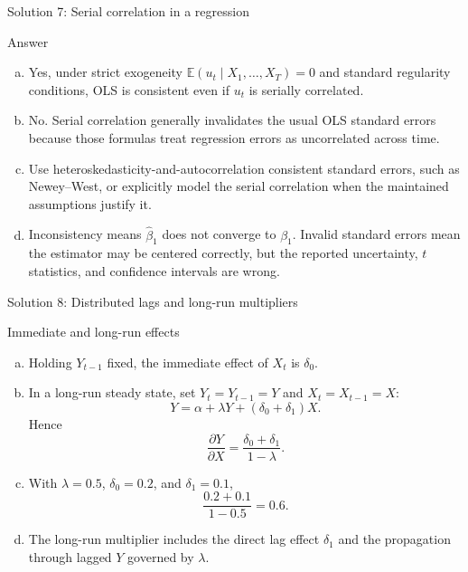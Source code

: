 \documentclass[10pt]{beamer}
\newcommand{\E}{\mathbb{E}}
\begin{document}
\begin{frame}{Solution 7: Serial correlation in a regression}
\label{s7}
\small
\begin{exampleblock}{Answer}
\begin{enumerate}[(a)]
  \item Yes, under strict exogeneity $\E(u_t\mid X_1,\ldots,X_T)=0$ and standard regularity conditions, OLS is consistent even if $u_t$ is serially correlated.
  \item No. Serial correlation generally invalidates the usual OLS standard errors because those formulas treat regression errors as uncorrelated across time.
  \item Use heteroskedasticity-and-autocorrelation consistent standard errors, such as Newey--West, or explicitly model the serial correlation when the maintained assumptions justify it.
  \item Inconsistency means $\hat\beta_1$ does not converge to $\beta_1$. Invalid standard errors mean the estimator may be centered correctly, but the reported uncertainty, $t$ statistics, and confidence intervals are wrong.
\end{enumerate}
\end{exampleblock}
\vfill
\hfill\hyperlink{q7}{}
\end{frame}

\begin{frame}{Solution 8: Distributed lags and long-run multipliers}
\label{s8}
\small
\begin{exampleblock}{Immediate and long-run effects}
\begin{enumerate}[(a)]
  \item Holding $Y_{t-1}$ fixed, the immediate effect of $X_t$ is $\delta_0$.
  \item In a long-run steady state, set $Y_t=Y_{t-1}=Y$ and $X_t=X_{t-1}=X$:
  \[
  Y=\alpha+\lambda Y+(\delta_0+\delta_1)X.
  \]
  Hence
  \[
  \frac{\partial Y}{\partial X}
  =\frac{\delta_0+\delta_1}{1-\lambda}.
  \]
  \item With $\lambda=0.5$, $\delta_0=0.2$, and $\delta_1=0.1$,
  \[
  \frac{0.2+0.1}{1-0.5}=0.6.
  \]
  \item The long-run multiplier includes the direct lag effect $\delta_1$ and the propagation through lagged $Y$ governed by $\lambda$.
\end{enumerate}
\end{exampleblock}
\vfill
\hfill\hyperlink{q8}{}
\end{frame}
\end{document}
